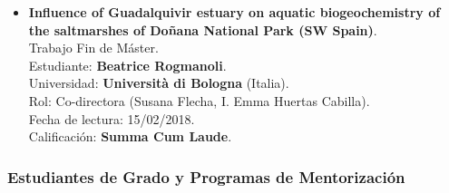 \documentclass[11pt,a4paper]{article}
\begin{document}
\begin{itemize}[leftmargin=*]
    \item \textbf{Influence of Guadalquivir estuary on aquatic biogeochemistry of the saltmarshes of Doñana National Park (SW Spain)}.\\
    Trabajo Fin de Máster.\\
    Estudiante: \textbf{Beatrice Rogmanoli}.\\
    Universidad: \textbf{Università di Bologna} (Italia).\\
    Rol: Co-directora (Susana Flecha, I. Emma Huertas Cabilla).\\
    Fecha de lectura: 15/02/2018.\\
    Calificación: \textbf{Summa Cum Laude}.

\end{itemize}
\subsubsection{Estudiantes de Grado y Programas de Mentorización}
\end{document}
